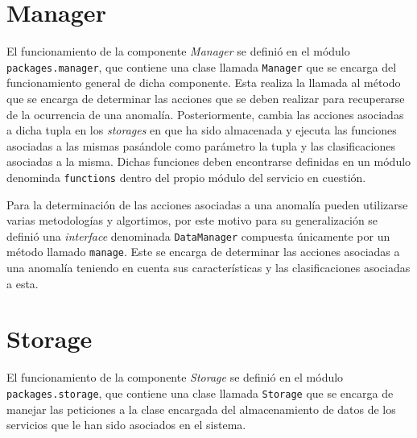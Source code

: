\section{Manager}
El funcionamiento de la componente \textit{Manager} se definió en el módulo
\texttt{packages.manager}, que contiene una clase llamada \texttt{Manager} que
se encarga del funcionamiento general de dicha componente. Esta realiza la
llamada al método que se encarga de determinar las acciones que se deben
realizar para recuperarse de la ocurrencia de una anomalía. Posteriormente,
cambia las acciones asociadas a dicha tupla en los \textit{storages} en que ha
sido almacenada y ejecuta las funciones asociadas a las mismas pasándole como
parámetro la tupla y las clasificaciones asociadas a la misma. Dichas funciones
deben encontrarse definidas en un módulo denominda \texttt{functions} dentro del
propio módulo del servicio en cuestión. 

Para la determinación de las acciones asociadas a una anomalía pueden utilizarse
varias metodologías y algortimos, por este motivo para su generalización se
definió una \textit{interface} denominada \texttt{DataManager} compuesta
únicamente por un método llamado \texttt{manage}. Este se encarga de determinar
las acciones asociadas a una anomalía teniendo en cuenta sus características y
las clasificaciones asociadas a esta. 

\section{Storage}
El funcionamiento de la componente \textit{Storage} se definió en el módulo
\texttt{packages.storage}, que contiene una clase llamada \texttt{Storage} que
se encarga de manejar las peticiones a la clase encargada del almacenamiento de
datos de los servicios que le han sido asociados en el sistema. 


